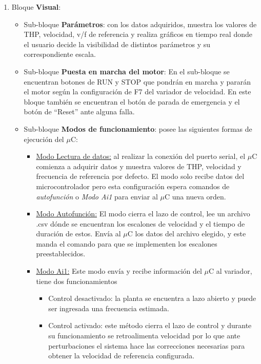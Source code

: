 \begin{enumerate}
\item Bloque \textbf{Visual}: 
\begin{itemize}
\item Sub-bloque \textbf{Parámetros}: con los datos adquiridos, muestra los valores de THP, velocidad, v/f de referencia y realiza gráficos en tiempo real donde el usuario decide la visibilidad de distintos parámetros y su correspondiente escala. 
\item Sub-bloque \textbf{Puesta en marcha del motor}: En el sub-bloque se encuentran botones de RUN y STOP que pondrán en marcha y pararán el motor según la configuración de F7 del variador de velocidad. En este bloque también se encuentran el botón de parada de emergencia y el botón de “Reset” ante alguna falla. 
\item Sub-bloque \textbf{Modos de funcionamiento}: posee las siguientes formas de ejecución del $\mu$C:
\begin{itemize}
\item \underline{Modo Lectura de datos:} al realizar la conexión del puerto serial, el $\mu$C comienza a adquirir datos y muestra valores de THP, velocidad y frecuencia de referencia por defecto. El modo solo recibe datos del microcontrolador pero esta configuración espera comandos de \textit{autofunción} o \textit{Modo Ai1} para enviar al $\mu$C una nueva orden.
\item \underline{Modo Autofunción:} El modo cierra el lazo de control, lee un archivo .csv dónde se encuentran los escalones de velocidad y el tiempo de duración de estos. Envía al $\mu$C los datos del archivo elegido, y este manda el
comando para que se implementen los escalones preestablecidos.

\item \underline{Modo Ai1:} Este modo envía y recibe información del $\mu$C al variador, tiene dos funcionamientos
\begin{itemize}
\item Control desactivado: la planta se encuentra a lazo abierto y puede ser ingresada una frecuencia estimada.
\item Control activado: este método cierra el lazo de control y durante su funcionamiento se retroalimenta velocidad por lo que ante perturbaciones el sistema hace las correcciones necesarias para obtener la velocidad de referencia configurada.
\end{itemize}
\end{itemize}
\end{itemize}



\end{enumerate}
